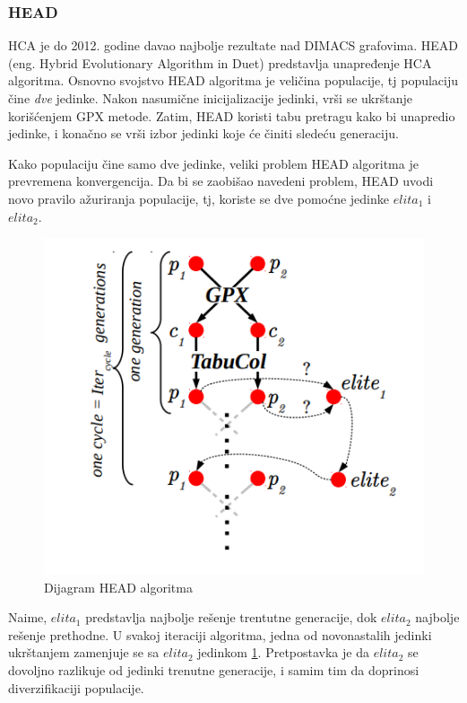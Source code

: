 \documentclass[a4paper]{article}
\begin{document}
\subsubsection{HEAD}
HCA je do 2012. godine davao najbolje rezultate nad DIMACS \cite{10.5555/548182} grafovima. HEAD (eng. Hybrid Evolutionary Algorithm in Duet) \cite{moalic2018variations} predstavlja unapređenje HCA algoritma. Osnovno svojstvo HEAD algoritma je veličina populacije, tj populaciju čine \textit{dve} jedinke. Nakon nasumične inicijalizacije jedinki, vrši se ukrštanje korišćenjem GPX metode. Zatim, HEAD koristi tabu pretragu kako bi unapredio jedinke, i konačno se vrši izbor jedinki koje će činiti sledeću generaciju. 

Kako populaciju čine samo dve jedinke, veliki problem HEAD algoritma je prevremena konvergencija. Da bi se zaobišao navedeni problem, HEAD uvodi novo pravilo ažuriranja populacije, tj, koriste se dve pomoćne jedinke $elita_1$ i $elita_2$.\begin{figure}[h!]
\centering
\includegraphics[scale=0.5]{head_algoritam}
\caption{Dijagram HEAD algoritma}
\label{head_algoritam}
\end{figure} Naime, $elita_1$ predstavlja najbolje rešenje trentutne generacije, dok $elita_2$ najbolje rešenje prethodne. U svakoj iteraciji algoritma, jedna od novonastalih jedinki ukrštanjem zamenjuje se sa $elita_2$ jedinkom \ref{head_algoritam}. Pretpostavka je da $elita_2$ se dovoljno razlikuje od jedinki trenutne generacije, i samim tim da doprinosi diverzifikaciji populacije.
\end{document}
